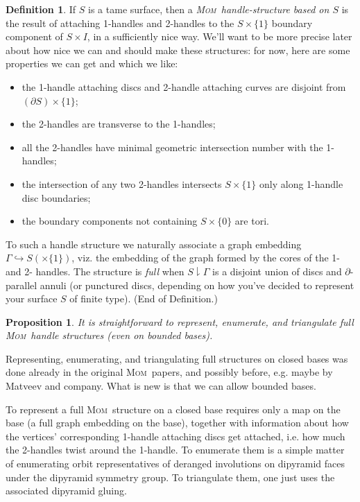 \documentclass{article}
\theoremstyle{plain}
\newtheorem{proposition}[theorem]{Proposition}
\theoremstyle{plain}
\theoremstyle{definition}
\newtheorem{definition}[theorem]{Definition}
\numberwithin{equation}{section}
\newcommand{\MOM}{\textsc{Mom}}
\begin{document}
\begin{definition}\label{defn:init}
If $S$ is a tame surface, then a \emph{\MOM\ handle-structure based on $S$}
is the result of attaching 1-handles and 2-handles to the $S\times \{1\}$
boundary component of $S\times I$, in a sufficiently nice way. We'll want
to be more precise later about how nice we can and should make these structures:
for now, here are some properties we can get and which we like:
\begin{itemize}
\item the 1-handle attaching discs and 2-handle attaching curves are disjoint
      from $(\partial S) \times \{1\}$;
\item the 2-handles are transverse to the 1-handles;
\item all the 2-handles have minimal geometric intersection number with the 1-handles;
\item the intersection of any two 2-handles intersects $S \times \{1\}$ only
      along 1-handle disc boundaries;
\item the boundary components not containing $S\times\{0\}$ are tori.
\end{itemize}

To such a handle structure we naturally associate a graph embedding
$\Gamma \hookrightarrow S (\times \{1\})$, viz. the embedding of the graph formed
by the cores of the 1- and 2- handles. The structure is \emph{full}
when $S \downharpoonright \Gamma$ is a disjoint union of discs and
$\partial$-parallel annuli (or punctured discs, depending on how
you've decided to represent your surface $S$ of finite type).
(End of Definition.)
\end{definition}
\begin{proposition}
It is straightforward to represent, enumerate, and triangulate
full \MOM\ handle structures (even on bounded bases).
\end{proposition}
\proof[Sketch]
Representing, enumerating, and triangulating full structures
on closed bases was done already in the original \MOM\ papers,
and possibly before, e.g. maybe by Matveev and company. What
is new is that we can allow bounded bases.

To represent a full \MOM\ structure on a closed base
requires only a map on the base (a full graph embedding on
the base), together with information about how the vertices'
corresponding 1-handle attaching discs get attached, i.e.
how much the 2-handles twist around the 1-handle. To enumerate
them is a simple matter of enumerating orbit representatives
of deranged involutions on dipyramid faces under the dipyramid
symmetry group. To triangulate them, one just uses the associated
dipyramid gluing.
\end{document}
